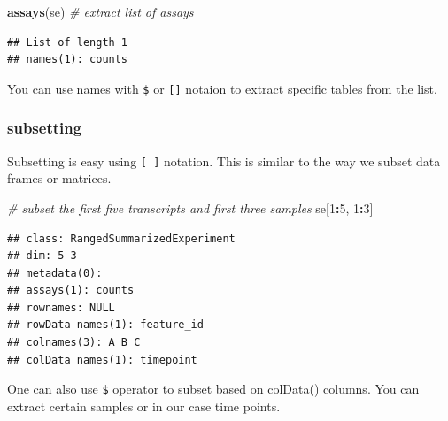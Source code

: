 \documentclass[12pt,]{krantz}
\newenvironment{Shaded}{\begin{snugshade}}{\end{snugshade}}
\newcommand{\CommentTok}[1]{\textcolor[rgb]{0.56,0.35,0.01}{\textit{#1}}}
\newcommand{\DecValTok}[1]{\textcolor[rgb]{0.00,0.00,0.81}{#1}}
\newcommand{\KeywordTok}[1]{\textcolor[rgb]{0.13,0.29,0.53}{\textbf{#1}}}
\newcommand{\NormalTok}[1]{#1}
\newcommand{\OperatorTok}[1]{\textcolor[rgb]{0.81,0.36,0.00}{\textbf{#1}}}
\begin{document}
\begin{Shaded}
\begin{Highlighting}[]
\KeywordTok{assays}\NormalTok{(se) }\CommentTok{# extract list of assays}
\end{Highlighting}
\end{Shaded}

\begin{verbatim}
## List of length 1
## names(1): counts
\end{verbatim}

You can use names with \texttt{\$} or \texttt{{[}{]}} notaion to extract specific tables from the list.

\begin{Shaded}
\end{Shaded}

\hypertarget{subsetting}{%
\subsubsection{subsetting}\label{subsetting}}

Subsetting is easy using \texttt{{[}\ {]}} notation. This is similar to the way we
subset data frames or matrices.

\begin{Shaded}
\begin{Highlighting}[]
\CommentTok{# subset the first five transcripts and first three samples}
\NormalTok{se[}\DecValTok{1}\OperatorTok{:}\DecValTok{5}\NormalTok{, }\DecValTok{1}\OperatorTok{:}\DecValTok{3}\NormalTok{]}
\end{Highlighting}
\end{Shaded}

\begin{verbatim}
## class: RangedSummarizedExperiment 
## dim: 5 3 
## metadata(0):
## assays(1): counts
## rownames: NULL
## rowData names(1): feature_id
## colnames(3): A B C
## colData names(1): timepoint
\end{verbatim}

One can also use \texttt{\$} operator to subset based on colData() columns. You can
extract certain samples or in our case time points.
\end{document}
